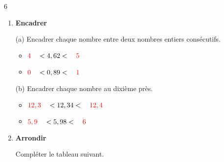 \documentclass[a4paper]{book}
\begin{document}
{\begin{exerciceNote}{6}
\begin{enumerate}[leftmargin=*]
            \item \textbf{Encadrer}
    
            \medskip
                        
            \begin{minipage}{0.45\linewidth}
                (a) Encadrer chaque nombre entre deux nombres entiers consécutifs.

                \medskip
                
                \begin{itemize}
                    \item $\textcolor{red}{4} \quad < 4,62 < \quad \textcolor{red}{5}$
    
                    \bigskip
                    
                    \item $\textcolor{red}{0} \quad < 0,89 < \quad \textcolor{red}{1}$
                \end{itemize}
            \end{minipage}
            \hfill
            \begin{minipage}{0.45\linewidth}
                (b) Encadrer chaque nombre au dixième près.
                
                \medskip
                
                \begin{itemize}
                    \item $\textcolor{red}{12,3} \quad < 12,34 < \quad \textcolor{red}{12,4}$
    
                    \bigskip
                    
                    \item $\textcolor{red}{5,9} \quad < 5,98 < \quad \textcolor{red}{6}$
                \end{itemize}
            \end{minipage}

            \medskip
             
        \item \textbf{Arrondir}

            \medskip
        
            Compléter le tableau suivant.
            

\end{enumerate}
\end{exerciceNote}}
\end{document}
